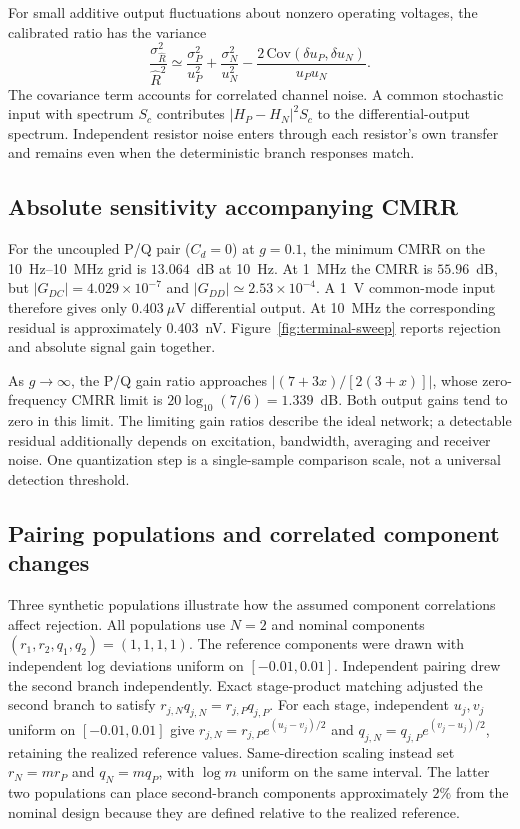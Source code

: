 For small additive output fluctuations about nonzero operating voltages, the calibrated ratio has the variance
\begin{equation}\label{eq:ratio-noise}
\frac{\sigma_{\hat R}^2}{\hat R^2}\simeq
\frac{\sigma_P^2}{u_P^2}+\frac{\sigma_N^2}{u_N^2}
-\frac{2\,\mathrm{Cov}(\delta u_P,\delta u_N)}{u_Pu_N}.
\end{equation}
The covariance term accounts for correlated channel noise. A common stochastic input with spectrum $S_c$ contributes $|H_P-H_N|^2S_c$ to the differential-output spectrum. Independent resistor noise enters through each resistor's own transfer and remains even when the deterministic branch responses match.

\subsection{Absolute sensitivity accompanying CMRR}

For the uncoupled P/Q pair ($C_d=0$) at $g=0.1$, the minimum CMRR on the 10~Hz--10~MHz grid is $13.064$~dB at 10~Hz. At 1~MHz the CMRR is $55.96$~dB, but $|G_{DC}|=4.029\times10^{-7}$ and $|G_{DD}|\simeq2.53\times10^{-4}$. A 1~V common-mode input therefore gives only $0.403~\mu$V differential output. At 10~MHz the corresponding residual is approximately $0.403$~nV. Figure~\ref{fig:terminal-sweep} reports rejection and absolute signal gain together.

As $g\to\infty$, the P/Q gain ratio approaches $|(7+3x)/[2(3+x)]|$, whose zero-frequency CMRR limit is $20\log_{10}(7/6)=1.339$~dB. Both output gains tend to zero in this limit. The limiting gain ratios describe the ideal network; a detectable residual additionally depends on excitation, bandwidth, averaging and receiver noise. One quantization step is a single-sample comparison scale, not a universal detection threshold.



\subsection{Pairing populations and correlated component changes}

Three synthetic populations illustrate how the assumed component correlations affect rejection. All populations use $N=2$ and nominal components $(r_1,r_2,q_1,q_2)=(1,1,1,1)$. The reference components were drawn with independent log deviations uniform on $[-0.01,0.01]$. Independent pairing drew the second branch independently. Exact stage-product matching adjusted the second branch to satisfy $r_{j,N}q_{j,N}=r_{j,P}q_{j,P}$. For each stage, independent $u_j,v_j$ uniform on $[-0.01,0.01]$ give $r_{j,N}=r_{j,P}e^{(u_j-v_j)/2}$ and $q_{j,N}=q_{j,P}e^{(v_j-u_j)/2}$, retaining the realized reference values. Same-direction scaling instead set $r_N=mr_P$ and $q_N=mq_P$, with $\log m$ uniform on the same interval. The latter two populations can place second-branch components approximately $2\%$ from the nominal design because they are defined relative to the realized reference.

